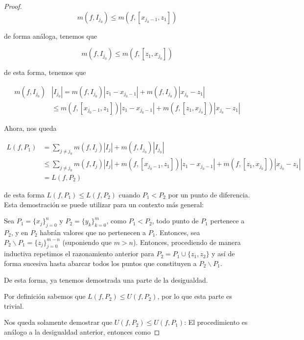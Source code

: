 \begin{proof}
    \[
    m(f, I_{j_0}) \leq m(f, [x_{j_0-1},z_1])
    \]
    
    \noindent de forma análoga, tenemos que
    
    \[
    m(f, I_{j_0}) \leq m(f, [z_1, x_{j_0}])
    \]
    
    \noindent de esta forma, tenemos que
    
    \begin{align*}
        m(f, I_{j_0})&|I_{j_0}| = m(f, I_{j_0})|z_1 - x_{j_0-1}| + m(f, I_{j_0})|x_{j_0} - z_1| \\
        &\leq m(f, [x_{j_0-1},z_1])|z_1 - x_{j_0-1}| + m(f, [z_1, x_{j_0}])|x_{j_0} - z_1|
    \end{align*}
    
    Ahora, nos queda
    
    \begin{align*}
        L(f, P_1) &= \sum_{j \neq j_0} m(f, I_j)|I_j| + m(f, I_{j_0})|I_{j_0}| \\
        &\leq \sum_{j \neq j_0} m(f, I_j)|I_j| + m(f, [x_{j_0-1},z_1])|z_1 - x_{j_0-1}| + m(f, [z_1, x_{j_0}])|x_{j_0} - z_1| \\
        &= L(f, P_2)
    \end{align*}
    
    \noindent de esta forma $L(f,P_1) \leq L(f, P_2)$ cuando $P_1 < P_2$ por un punto de diferencia. Esta demostración se puede utilizar para un contexto más general:
    
    Sea $P_1 = \{x_j\}_{j=0}^n$ y $P_2 = \{y_k\}_{k=0}^m$, como $P_1 < P_2$, todo punto de $P_1$ pertenece a $P_2$, y en $P_2$ habrán valores que no pertenecen a $P_1$. Entonces, sea $P_2 \smallsetminus P_1 = \{ z_j \}_{j=0}^{m-n}$ (suponiendo que $m > n$). Entonces, procediendo de manera inductiva repetimos el razonamiento anterior para $P_2 = P_1 \cup \{z_1, z_2\}$ y así de forma sucesiva hasta abarcar todos los puntos que constituyen a $P_2 \smallsetminus P_1$.
    
    De esta forma, ya tenemos demostrada una parte de la desigualdad.
    
    Por definición sabemos que $L(f, P_2) \leq U(f,P_2)$, por lo que esta parte es trivial.
    
    Nos queda solamente demostrar que $U(f, P_2) \leq U(f, P_1)$: El procedimiento es análogo a la desigualdad anterior, entonces como
\end{proof}

